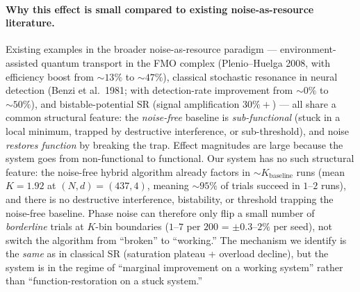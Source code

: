 \documentclass[11pt]{article}
\begin{document}
\paragraph{Why this effect is small compared to existing noise-as-resource literature.}
Existing examples in the broader noise-as-resource paradigm --- environment-assisted quantum transport in the FMO complex (Plenio--Huelga 2008, with efficiency boost from $\sim 13\%$ to $\sim 47\%$), classical stochastic resonance in neural detection (Benzi et al.\ 1981; with detection-rate improvement from $\sim 0\%$ to $\sim 50\%$), and bistable-potential SR (signal amplification $30\%+$) --- all share a common structural feature: the \emph{noise-free} baseline is \emph{sub-functional} (stuck in a local minimum, trapped by destructive interference, or sub-threshold), and noise \emph{restores function} by breaking the trap. Effect magnitudes are large because the system goes from non-functional to functional. Our system has no such structural feature: the noise-free hybrid algorithm already factors in $\sim K_{\text{baseline}}$ runs (mean $K = 1.92$ at $(N, d) = (437, 4)$, meaning $\sim 95\%$ of trials succeed in $1$--$2$ runs), and there is no destructive interference, bistability, or threshold trapping the noise-free baseline. Phase noise can therefore only flip a small number of \emph{borderline} trials at $K$-bin boundaries ($1$--$7$ per $200$ = $\pm 0.3$--$2\%$ per seed), not switch the algorithm from ``broken'' to ``working.'' The mechanism we identify is the \emph{same} as in classical SR (saturation plateau + overload decline), but the system is in the regime of ``marginal improvement on a working system'' rather than ``function-restoration on a stuck system.''
\end{document}
